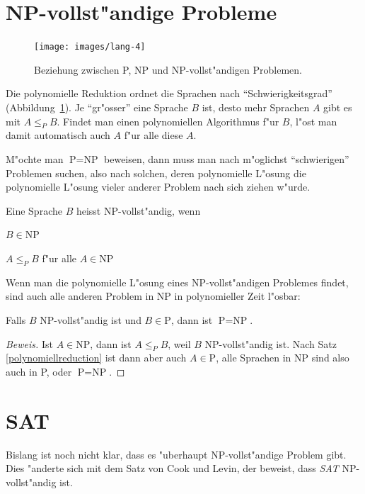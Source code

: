 \section{NP-vollst"andige Probleme}
\begin{figure}
\begin{center}
\texttt{[image: images/lang-4]}
\end{center}
\caption{Beziehung zwischen P, NP und NP-vollst"andigen Problemen.
\label{pnpnpcomplete}}
\end{figure}%
Die polynomielle Reduktion ordnet die Sprachen nach ``Schwierigkeitsgrad''
(Abbildung~\ref{pnpnpcomplete}).
Je ``gr"osser'' eine Sprache $B$ ist, desto mehr Sprachen $A$ gibt es
mit $A\le_P B$. Findet man einen polynomiellen Algorithmus f"ur $B$,
l"ost man damit automatisch auch $A$ f"ur alle diese $A$. 

M"ochte man $\text{P} = \text{NP}$ beweisen, dann muss man nach
m"oglichst ``schwierigen'' Problemen suchen, also nach solchen,
deren polynomielle L"osung die polynomielle L"osung vieler anderer
Problem nach sich ziehen w"urde. 

\begin{definition}
Eine Sprache $B$ heisst NP-vollst"andig, wenn 
\begin{compactenum}
\item $B\in\text{NP}$
\item $A\le_P B$ f"ur alle $A\in\text{NP}$
\end{compactenum}
\end{definition}

Wenn man die polynomielle L"osung eines NP-vollst"andigen Problemes
findet, sind auch alle anderen Problem in NP in polynomieller Zeit
l"osbar:

\begin{satz}
Falls $B$ NP-vollst"andig ist und $B\in\text{P}$, dann ist
$\text{P}=\text{NP}$.
\end{satz}

\begin{proof}[Beweis]
Ist $A\in\text{NP}$, dann ist $A\le_P B$, weil $B$ NP-vollst"andig ist.
Nach Satz \ref{polynomiellreduction} ist dann aber auch
$A\in\text{P}$, alle Sprachen
in NP sind also auch in P, oder $\text{P}=\text{NP}$.
\end{proof}

\section{SAT}
Bislang ist noch nicht klar, dass es "uberhaupt NP-vollst"andige
Problem gibt. Dies "anderte sich mit dem Satz von Cook und Levin,
der beweist, dass \textsl{SAT} NP-vollst"andig ist.

